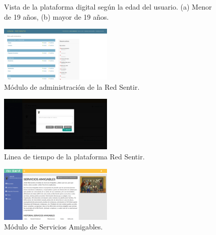 \documentclass[journal,transmag]{IEEEtran}
\begin{document}
\begin{figure}[tbp]
  \centering
	  \hspace{1mm}
  \caption{Vista de la plataforma digital según la edad del usuario. (a) Menor de 19 años, (b) mayor de 19 años.}
  \label{fig:vista_plataforma}
\end{figure}

\begin{figure}[tbp]
\centering
\includegraphics[width=0.48\textwidth]{admin.png}
\caption{Módulo de administración de la Red Sentir.}
\label{fig:admin}
\end{figure}

\begin{figure}[tbp]
\centering
\includegraphics[width=0.48\textwidth]{novedades.png}
\caption{Linea de tiempo de la plataforma Red Sentir.}
\label{fig:novedades}
\end{figure}

\begin{figure}[tbp]
\centering
\includegraphics[width=0.48\textwidth]{SA.png}
\caption{Módulo de Servicios Amigables.}
\label{fig:SA}
\end{figure}
\end{document}
